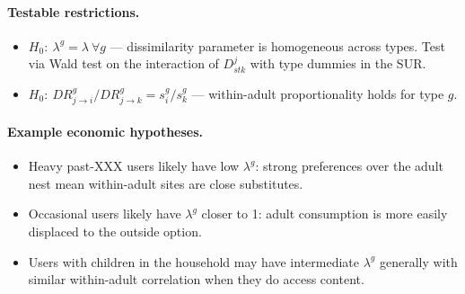\documentclass{article}
\begin{document}
\paragraph{Testable restrictions.}
\begin{itemize}
  \item $H_0{:}\ \lambda^g = \lambda\ \forall g$ --- dissimilarity parameter
    is homogeneous across types.  Test via Wald test on the interaction of
    $D_{stk}^j$ with type dummies in the SUR.
  \item $H_0{:}\ DR_{j\to i}^g / DR_{j\to k}^g = s_i^g/s_k^g$ ---
    within-adult proportionality holds for type $g$.
\end{itemize}

\paragraph{Example economic hypotheses.}
\begin{itemize}
  \item Heavy past-XXX users likely have low $\lambda^g$: strong preferences
    over the adult nest mean within-adult sites are close substitutes.
  \item Occasional users likely have $\lambda^g$ closer to 1: adult
    consumption is more easily displaced to the outside option.
  \item Users with children in the household may have intermediate $\lambda^g$
    generally with similar within-adult correlation when they do access content.
\end{itemize}
\end{document}
